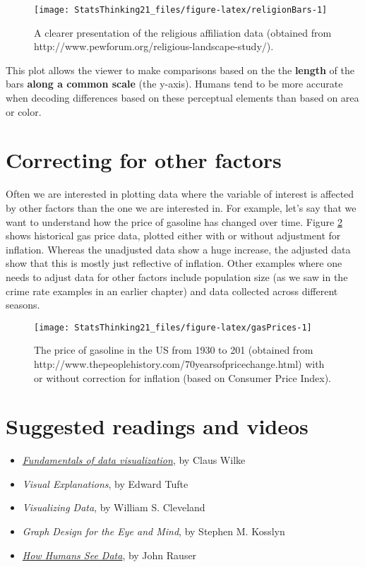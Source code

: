 \documentclass[]{book}
\providecommand{\tightlist}{%
  \setlength{\itemsep}{0pt}\setlength{\parskip}{0pt}}
\theoremstyle{definition}
\theoremstyle{definition}
\theoremstyle{definition}
\theoremstyle{remark}
\begin{document}
\begin{figure}
\texttt{[image: StatsThinking21\_files/figure-latex/religionBars-1]} \caption{A clearer presentation of the religious affiliation data (obtained from http://www.pewforum.org/religious-landscape-study/).}\label{fig:religionBars}
\end{figure}

This plot allows the viewer to make comparisons based on the the
\textbf{length} of the bars \textbf{along a common scale} (the y-axis).
Humans tend to be more accurate when decoding differences based on these
perceptual elements than based on area or color.

\section{Correcting for other
factors}\label{correcting-for-other-factors}

Often we are interested in plotting data where the variable of interest
is affected by other factors than the one we are interested in. For
example, let's say that we want to understand how the price of gasoline
has changed over time. Figure \ref{fig:gasPrices} shows historical gas
price data, plotted either with or without adjustment for inflation.
Whereas the unadjusted data show a huge increase, the adjusted data show
that this is mostly just reflective of inflation. Other examples where
one needs to adjust data for other factors include population size (as
we saw in the crime rate examples in an earlier chapter) and data
collected across different seasons.

\begin{figure}
\texttt{[image: StatsThinking21\_files/figure-latex/gasPrices-1]} \caption{The price of gasoline in the US from 1930 to 201 (obtained from http://www.thepeoplehistory.com/70yearsofpricechange.html) with or without correction for inflation (based on Consumer Price Index).}\label{fig:gasPrices}
\end{figure}

\section{Suggested readings and
videos}\label{suggested-readings-and-videos}

\begin{itemize}
\tightlist
\item
  \href{https://serialmentor.com/dataviz/}{\emph{Fundamentals of data
  visualization}}, by Claus Wilke
\item
  \emph{Visual Explanations}, by Edward Tufte
\item
  \emph{Visualizing Data}, by William S. Cleveland
\item
  \emph{Graph Design for the Eye and Mind}, by Stephen M. Kosslyn
\item
  \href{https://www.youtube.com/watch?v=fSgEeI2Xpdc\&feature=youtu.be}{\emph{How
  Humans See Data}}, by John Rauser
\end{itemize}
\end{document}
